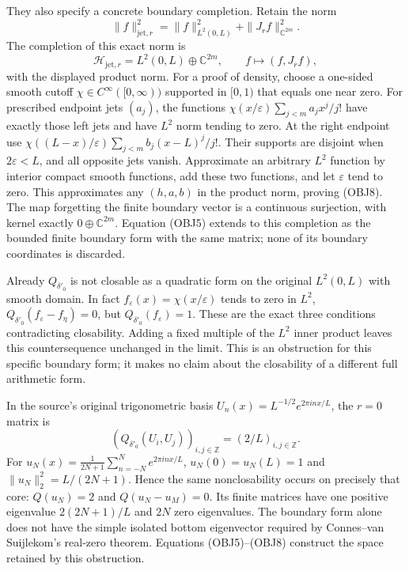 They also specify a concrete boundary completion. Retain the norm
\begin{equation}\tag{OBJ7}
 \|f\|_{\mathrm{jet},r}^2=\|f\|_{L^2(0,L)}^2+\|J_rf\|_{\mathbb C^{2m}}^2.
\end{equation}
The completion of this exact norm is
\begin{equation}\tag{OBJ8}
 \mathcal H_{\mathrm{jet},r}
       =L^2(0,L)\oplus\mathbb C^{2m},
 \qquad f\longmapsto(f,J_rf),
\end{equation}
with the displayed product norm. For a proof of density, choose a
one-sided smooth cutoff $\chi\in C^\infty([0,\infty))$ supported
in $[0,1)$ that equals one near zero.
For prescribed endpoint jets $(a_j)$, the functions
$\chi(x/\varepsilon)\sum_{j<m}a_jx^j/j!$ have exactly those left
jets and have $L^2$ norm tending to zero. At the right endpoint use
$\chi((L-x)/\varepsilon)\sum_{j<m}b_j(x-L)^j/j!$. Their supports
are disjoint when $2\varepsilon<L$, and all opposite jets vanish.
Approximate an arbitrary $L^2$ function by interior compact smooth
functions, add these two functions, and let $\varepsilon$ tend to zero.
This approximates any $(h,a,b)$ in the product norm, proving (OBJ8).
The map forgetting the finite boundary vector is a continuous
surjection, with kernel exactly $0\oplus\mathbb C^{2m}$. Equation
(OBJ5) extends to this completion as the bounded finite boundary form
with the same matrix; none of its boundary coordinates is discarded.

Already $Q_{\delta'_0}$ is not closable as a quadratic form on the
original $L^2(0,L)$ with smooth domain. In fact
$f_\varepsilon(x)=\chi(x/\varepsilon)$ tends to zero in $L^2$,
$Q_{\delta'_0}(f_\varepsilon-f_\eta)=0$, but
$Q_{\delta'_0}(f_\varepsilon)=1$. These are the exact three conditions
contradicting closability. Adding a fixed multiple of the $L^2$ inner
product leaves this countersequence unchanged in the limit.
This is an obstruction for this specific boundary form; it makes no
claim about the closability of a different full arithmetic form.

In the source's original trigonometric basis
$U_n(x)=L^{-1/2}e^{2\pi inx/L}$, the $r=0$ matrix is
\begin{equation}\tag{OBJ9}
 (Q_{\delta'_0}(U_i,U_j))_{i,j\in\mathbb Z}
             =(2/L)_{i,j\in\mathbb Z}.
\end{equation}
For $u_N(x)=\frac1{2N+1}\sum_{n=-N}^N e^{2\pi inx/L}$,
$u_N(0)=u_N(L)=1$ and $\|u_N\|_2^2=L/(2N+1)$.
Hence the same nonclosability occurs on precisely that core:
$Q(u_N)=2$ and $Q(u_N-u_M)=0$. Its finite matrices have one positive
eigenvalue $2(2N+1)/L$ and $2N$ zero eigenvalues. The boundary form
alone does not have the simple isolated bottom eigenvector required
by Connes--van Suijlekom's real-zero theorem. Equations (OBJ5)--(OBJ8)
construct the space retained by this obstruction.


